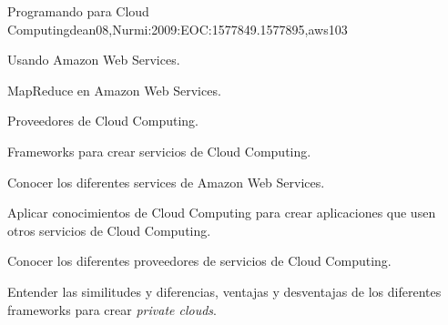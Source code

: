 \begin{syllabus}
\begin{unit}{Programando para Cloud Computing}{dean08,Nurmi:2009:EOC:1577849.1577895,aws}{10}{3}
   \begin{topics}
      \item Usando Amazon Web Services.
      \item MapReduce en Amazon Web Services.
      \item Proveedores de Cloud Computing.
      \item Frameworks para crear servicios de Cloud Computing.
   \end{topics}

   \begin{learningoutcomes}
      \item Conocer los diferentes services de Amazon Web Services.
      \item Aplicar conocimientos de Cloud Computing para crear aplicaciones que usen otros servicios de Cloud Computing.
      \item Conocer los diferentes proveedores de servicios de Cloud Computing.
      \item Entender las similitudes y diferencias, ventajas y desventajas de los diferentes frameworks para crear {\it private clouds}.
   \end{learningoutcomes}
\end{unit}



\begin{coursebibliography}
\end{coursebibliography}

\end{syllabus}

